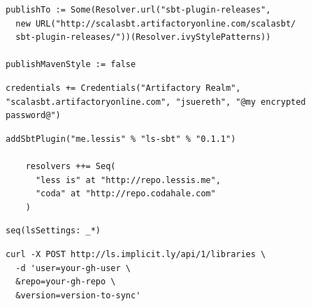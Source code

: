 \documentclass[utf8,utf8x]{beamer}
\begin{document}

\begin{frame}[fragile]
  \begin{lstlisting}[title={build.sbt}]
publishTo := Some(Resolver.url("sbt-plugin-releases", 
  new URL("http://scalasbt.artifactoryonline.com/scalasbt/
  sbt-plugin-releases/"))(Resolver.ivyStylePatterns))

publishMavenStyle := false
  \end{lstlisting}

  \begin{lstlisting}[title={sbtpluginpublish.sbt}]
credentials += Credentials("Artifactory Realm", "scalasbt.artifactoryonline.com", "jsuereth", "@my encrypted password@")
  \end{lstlisting}

\end{frame}




\begin{frame}[fragile]
  \begin{lstlisting}[title={plugins.sbt}]
    addSbtPlugin("me.lessis" % "ls-sbt" % "0.1.1")

    resolvers ++= Seq(
      "less is" at "http://repo.lessis.me",
      "coda" at "http://repo.codahale.com"
    )
  \end{lstlisting}
  
  \begin{lstlisting}[title={plugins.sbt}]
    seq(lsSettings: _*)
  \end{lstlisting}
  
  \begin{lstlisting}[title={usage}]
    curl -X POST http://ls.implicit.ly/api/1/libraries \
  -d 'user=your-gh-user \ 
  &repo=your-gh-repo \
  &version=version-to-sync'
  \end{lstlisting}
\end{frame}
\end{document}
